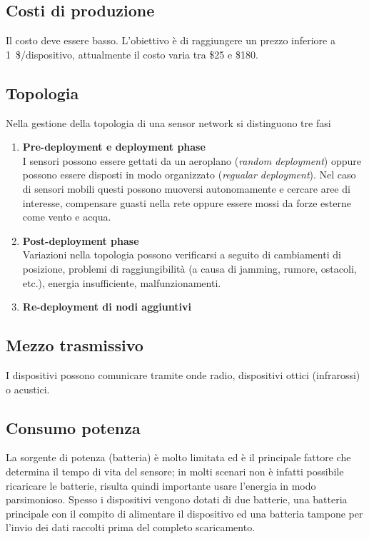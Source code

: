 \subsection{Costi di produzione}
	Il costo deve essere basso.
	L'obiettivo è di raggiungere un prezzo inferiore a 1~\$/dispositivo, attualmente il costo varia tra \$25 e \$180.
	
\subsection{Topologia}
	Nella gestione della topologia di una sensor network si distinguono tre fasi
	\begin{enumerate}
		\item \textbf{Pre-deployment e deployment phase}\\
			I sensori possono essere gettati da un aeroplano (\emph{random deployment}) oppure possono essere disposti in modo organizzato (\emph{regualar deployment}).
			Nel caso di sensori mobili questi possono muoversi autonomamente e cercare aree di interesse, compensare  guasti nella rete oppure essere mossi da forze esterne come vento e acqua.
			
		\item \textbf{Post-deployment phase}\\
			Variazioni nella topologia possono verificarsi a seguito di cambiamenti di posizione, problemi di raggiungibilità (a causa di jamming, rumore, ostacoli, etc.), energia insufficiente, malfunzionamenti.
		
		\item \textbf{Re-deployment di nodi aggiuntivi}\\
	\end{enumerate}

\subsection{Mezzo trasmissivo}
	I dispositivi possono comunicare tramite onde radio, dispositivi ottici (infrarossi) o acustici.
	
\subsection{Consumo potenza}
	La sorgente di potenza (batteria) è molto limitata ed è il principale fattore che determina il tempo di vita del sensore; in molti scenari non è infatti possibile ricaricare le batterie, risulta quindi importante usare l'energia in modo parsimonioso.
	Spesso i dispositivi vengono dotati di due batterie, una batteria principale con il compito di alimentare il dispositivo ed una batteria tampone per l'invio dei dati raccolti prima del completo scaricamento.
	
